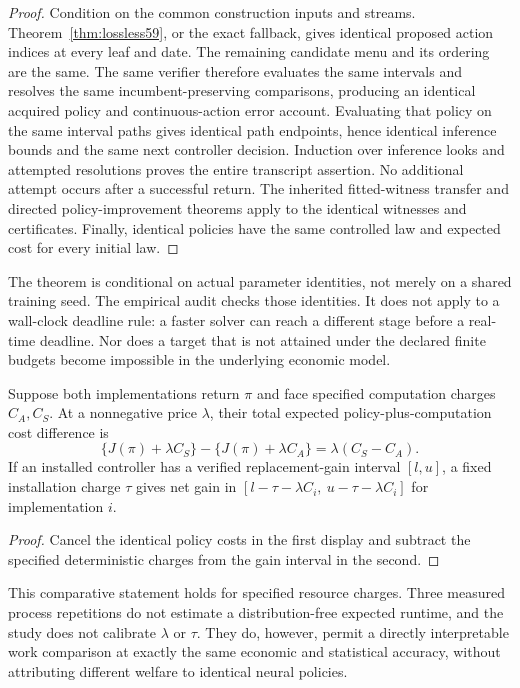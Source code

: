 \begin{proof}
Condition on the common construction inputs and streams. Theorem~\ref{thm:lossless59}, or the exact fallback, gives identical proposed action indices at every leaf and date. The remaining candidate menu and its ordering are the same. The same verifier therefore evaluates the same intervals and resolves the same incumbent-preserving comparisons, producing an identical acquired policy and continuous-action error account. Evaluating that policy on the same interval paths gives identical path endpoints, hence identical inference bounds and the same next controller decision. Induction over inference looks and attempted resolutions proves the entire transcript assertion. No additional attempt occurs after a successful return. The inherited fitted-witness transfer and directed policy-improvement theorems apply to the identical witnesses and certificates. Finally, identical policies have the same controlled law and expected cost for every initial law.
\end{proof}

The theorem is conditional on actual parameter identities, not merely on a shared training seed. The empirical audit checks those identities. It does not apply to a wall-clock deadline rule: a faster solver can reach a different stage before a real-time deadline. Nor does a target that is not attained under the declared finite budgets become impossible in the underlying economic model.

\begin{corollary}\label{cor:price59}
Suppose both implementations return $\pi$ and face specified computation charges $C_A,C_S$. At a nonnegative price $\lambda$, their total expected policy-plus-computation cost difference is
\[
 \{J(\pi)+\lambda C_S\}-\{J(\pi)+\lambda C_A\}
       =\lambda(C_S-C_A).
\]
If an installed controller has a verified replacement-gain interval $[l,u]$, a fixed installation charge $\tau$ gives net gain in
$[l-\tau-\lambda C_i,\ u-\tau-\lambda C_i]$ for implementation $i$.
\end{corollary}

\begin{proof}
Cancel the identical policy costs in the first display and subtract the specified deterministic charges from the gain interval in the second.
\end{proof}

This comparative statement holds for specified resource charges. Three measured process repetitions do not estimate a distribution-free expected runtime, and the study does not calibrate $\lambda$ or $\tau$. They do, however, permit a directly interpretable work comparison at exactly the same economic and statistical accuracy, without attributing different welfare to identical neural policies.
